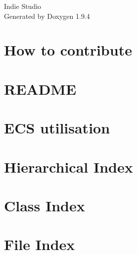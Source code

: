 \documentclass[twoside]{book}
\newcommand{\+}{\discretionary{\mbox{\scriptsize$\hookleftarrow$}}{}{}}
\newcommand{\clearemptydoublepage}{%
    \newpage{\pagestyle{empty}\cleardoublepage}%
  }
\begin{document}
  \raggedbottom
    \hypersetup{pageanchor=false,
                bookmarksnumbered=true,
                pdfencoding=unicode
               }
  \begin{titlepage}
  \vspace*{7cm}
  \begin{center}%
  {\Large Indie Studio}\\
  \vspace*{1cm}
  {\large Generated by Doxygen 1.9.4}\\
  \end{center}
  \end{titlepage}
  \clearemptydoublepage
  \tableofcontents
  \clearemptydoublepage
  \hypersetup{pageanchor=true}
\chapter{How to contribute}
\label{md_CONTRIBUTING}

\chapter{README}
\label{md_README}

\chapter{ECS utilisation}
\label{md_src_ecs_README}

\chapter{Hierarchical Index}

\chapter{Class Index}

\chapter{File Index}

\end{document}
